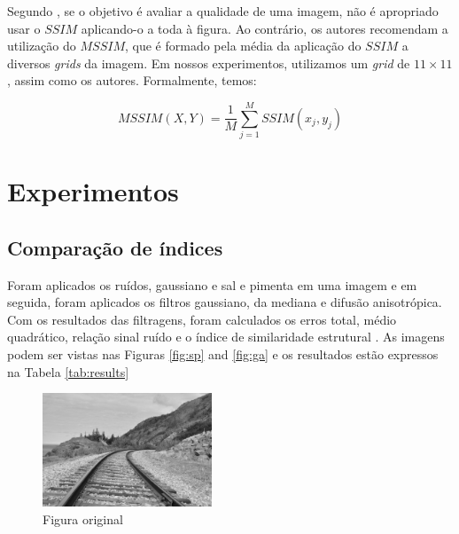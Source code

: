 \documentclass[10pt,a4paper]{article}
\begin{document}
Segundo \cite{article}, se o objetivo é avaliar a qualidade de uma imagem, não é apropriado usar o $\mathit{SSIM}$ aplicando-o a toda à figura. Ao contrário, os autores recomendam a utilização do $\mathit{MSSIM}$, que é formado pela média da aplicação do $\mathit{SSIM}$ a diversos \textit{grids} da imagem. Em nossos experimentos, utilizamos um \textit{grid} de $11 \times 11$, assim como os autores. Formalmente, temos:

\begin{equation}
    \mathit{MSSIM}(X,Y) = \frac{1}{M} \sum_{j=1}^M \mathit{SSIM}(x_j, y_j)
    \label{eq:mssim}
\end{equation}

\newpage

\section{Experimentos}
\subsection{Comparação de índices}
Foram aplicados os ruídos, gaussiano e sal e pimenta em uma imagem e em seguida, foram aplicados os filtros gaussiano, da mediana e difusão anisotrópica.
Com os resultados das filtragens, foram calculados os erros total, médio quadrático, relação sinal ruído e o índice de similaridade estrutural \cite{article}. As imagens podem ser vistas nas Figuras \ref{fig:sp} and \ref{fig:ga} e os resultados estão expressos na Tabela \ref{tab:results}
\begin{figure}[!ht]
    \centering
        \includegraphics[width=0.45\textwidth]{src.jpg}
        \caption{Figura original}
        \label{fig:src}
\end{figure}
\end{document}
